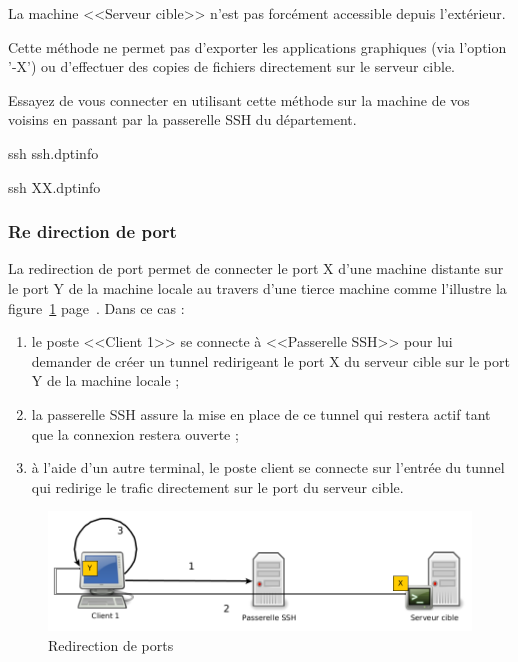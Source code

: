 \documentclass[11pt]{article}
\begin{document}
La machine <<Serveur cible>> n'est pas forcément accessible depuis l'extérieur.

Cette méthode ne permet pas d'exporter les applications graphiques (via l'option '-X') ou d'effectuer des copies de fichiers directement sur le serveur cible.

Essayez de vous connecter en utilisant cette méthode sur la machine de vos voisins en passant par la passerelle SSH du département.

\begin{solution}

ssh ssh.dptinfo

ssh XX.dptinfo

\end{solution}

\subsubsection{Re direction de port}

La redirection de port permet de connecter le port X d'une machine distante sur le port Y de la machine locale au travers d'une tierce machine comme l'illustre la figure~\ref{portredir} page~\pageref{portredir}. Dans ce cas :

\begin{enumerate}
 \item le poste <<Client 1>> se connecte à <<Passerelle SSH>> pour lui demander de créer un tunnel redirigeant le port X du serveur cible sur le port Y de la machine locale ;
 \item la passerelle SSH assure la mise en place de ce tunnel qui restera actif tant que la connexion restera ouverte ;
 \item à l'aide d'un autre terminal, le poste client se connecte sur l'entrée du tunnel qui redirige le trafic directement sur le port du serveur cible.
\end{enumerate}

\begin{figure}[h]
 \centering
 \includegraphics[width=15cm]{pivot_redirection_de_port}
 \caption{\label{portredir}Redirection de ports}
\end{figure}
\end{document}
